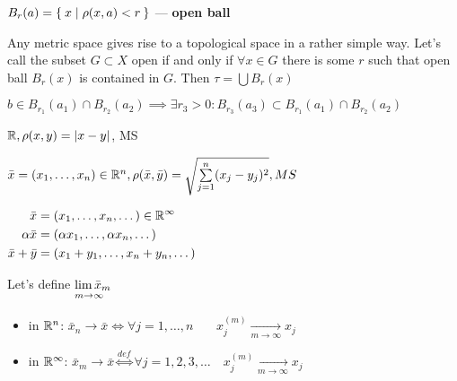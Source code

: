 \begin{defn}
  $B_r (a) = \Set{x | \rho(x, a) < r}$ --- \textbf{open ball}
\end{defn}

\begin{stm}
  Any metric space gives rise to a topological space in a rather simple way.
  Let's call the subset $G \subset X$ open if and only if $\forall x \in G$
  there is some $r$ such that open ball $B_r(x)$ is contained in $G$. Then $\tau = \bigcup B_r (x)$
\end{stm}

\begin{stm}
  $b \in B_{r_1} (a_1) \cap B_{r_2} (a_2) \implies \exists r_3 > 0: B_{r_3}
  (a_3) \subset B_{r_1} (a_1) \cap B_{r_2} (a_2)$
\end{stm}
\noindent

\begin{ex}
  $\mathbb{R}, \rho(x, y) = |x - y|$, MS
\end{ex}

\begin{ex}
  $\bar{x} = (x_1, \dotsc, x_n) \in \mathbb{R}^n, \rho(\bar{x}, \bar{y}) = \sqrt{\sum\limits_{j = 1}^n(x_j - y_j)^2}, MS$
\end{ex}

\begin{ex}
    \hspace{-1.9em}$\begin{aligned}[t]
      \bar{x} &= (x_1, \dotsc, x_n, \dotso) \in \mathbb{R}^\infty \\
      \alpha\bar{x} &= (\alpha x_1, \dotsc, \alpha x_n, \dotsc) \\
      \bar{x} + \bar{y} &= (x_1 + y_1, \dotsc, x_n + y_n, \dotsc)
  \end{aligned}$

      Let's define $\alim{\bar{x}_m}{m \to \infty}$
      \begin{itemize}
          \item{in $\mathbb{R}^n$:}
              $\bar{x}_n \to \bar{x} \iff \forall j = 1, \dotsc, n\quad\ \ \:\,x_j^{(m)} \xrightarrow[m \to \infty]{} x_j$
          \item{in $\mathbb{R}^\infty$:}
              $\bar{x}_m \to \bar{x} \overset{def}{\iff} \forall j = 1,2,3,\dotso \quad x_j^{(m)} \xrightarrow[m \to \infty]{} x_j$
      \end{itemize}
\end{ex}


